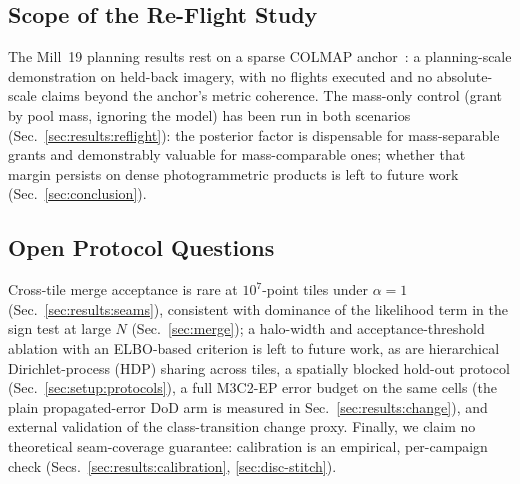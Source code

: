 \subsection{Scope of the Re-Flight Study}
\label{sec:disc-anchor}

 The Mill~19 planning results rest on a sparse COLMAP
anchor~\cite{turki2022meganerf}: a planning-scale demonstration on
held-back imagery, with no flights executed and no absolute-scale claims
beyond the anchor's metric coherence. The mass-only control (grant by
pool mass, ignoring the model) has been run in both scenarios
(Sec.~\ref{sec:results:reflight}): the posterior factor is dispensable
for mass-separable grants and demonstrably valuable for
mass-comparable ones; whether that margin persists on dense
photogrammetric products is left to future work
(Sec.~\ref{sec:conclusion}).

\subsection{Open Protocol Questions}
\label{sec:disc-open}

 Cross-tile merge acceptance is rare at $10^{7}$-point tiles under
$\alpha=1$ (Sec.~\ref{sec:results:seams}), consistent with dominance
of the likelihood term in the sign test at large $N$
(Sec.~\ref{sec:merge}); a halo-width and acceptance-threshold ablation
with an ELBO-based criterion is left to future work, as are
hierarchical Dirichlet-process (HDP) sharing across tiles, a spatially
blocked hold-out
protocol (Sec.~\ref{sec:setup:protocols}), a full M3C2-EP error
budget on the same cells (the plain propagated-error DoD arm is
measured in Sec.~\ref{sec:results:change}), and
external validation of the class-transition change proxy. Finally, we
claim no theoretical seam-coverage guarantee: calibration is an
empirical, per-campaign check
(Secs.~\ref{sec:results:calibration}, \ref{sec:disc-stitch}).
